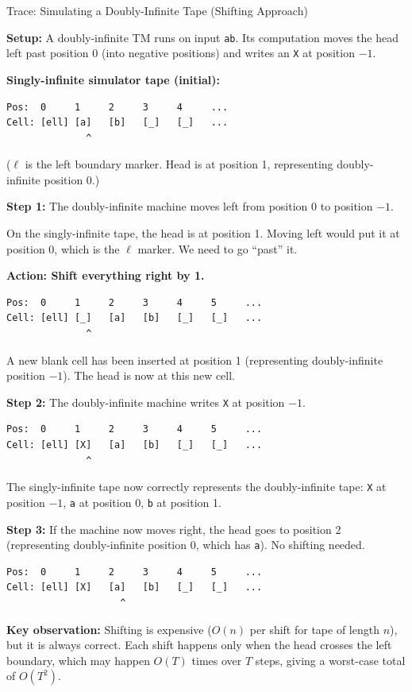 \documentclass[11pt,a4paper]{article}
\begin{document}
\begin{examplebox}{{Trace: Simulating a Doubly-Infinite Tape (Shifting Approach)}}

\textbf{Setup:} A doubly-infinite TM runs on input \texttt{ab}. Its computation moves the head left past position 0 (into negative positions) and writes an \texttt{X} at position $-1$.

\textbf{Singly-infinite simulator tape (initial):}
\begin{lstlisting}
Pos:  0     1     2     3     4     ...
Cell: [ell] [a]   [b]   [_]   [_]   ...
              ^
\end{lstlisting}
($\ell$ is the left boundary marker. Head is at position 1, representing doubly-infinite position 0.)

\textbf{Step 1:} The doubly-infinite machine moves left from position 0 to position $-1$.

On the singly-infinite tape, the head is at position 1. Moving left would put it at position 0, which is the $\ell$ marker. We need to go ``past'' it.

\textbf{Action: Shift everything right by 1.}
\begin{lstlisting}
Pos:  0     1     2     3     4     5     ...
Cell: [ell] [_]   [a]   [b]   [_]   [_]   ...
              ^
\end{lstlisting}
A new blank cell has been inserted at position 1 (representing doubly-infinite position $-1$). The head is now at this new cell.

\textbf{Step 2:} The doubly-infinite machine writes \texttt{X} at position $-1$.
\begin{lstlisting}
Pos:  0     1     2     3     4     5     ...
Cell: [ell] [X]   [a]   [b]   [_]   [_]   ...
              ^
\end{lstlisting}

The singly-infinite tape now correctly represents the doubly-infinite tape: \texttt{X} at position $-1$, \texttt{a} at position 0, \texttt{b} at position 1.

\textbf{Step 3:} If the machine now moves right, the head goes to position 2 (representing doubly-infinite position 0, which has \texttt{a}). No shifting needed.
\begin{lstlisting}
Pos:  0     1     2     3     4     5     ...
Cell: [ell] [X]   [a]   [b]   [_]   [_]   ...
                    ^
\end{lstlisting}

\textbf{Key observation:} Shifting is expensive ($O(n)$ per shift for tape of length $n$), but it is always correct. Each shift happens only when the head crosses the left boundary, which may happen $O(T)$ times over $T$ steps, giving a worst-case total of $O(T^2)$.
\end{examplebox}
\end{document}
